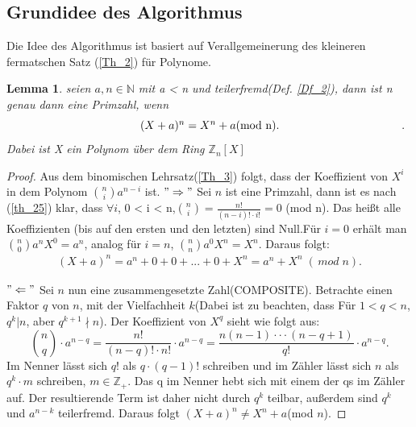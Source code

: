 \documentclass[12pt,oneside]{article}
\newtheorem{lemma}[theorem]{Lemma}
\theoremstyle{remark}
\theoremstyle{definition}
\begin{document}
\subsection{Grundidee des Algorithmus}
Die Idee des Algorithmus ist basiert auf  Verallgemeinerung des kleineren fermatschen Satz (\ref{Th_2}) für Polynome.
\begin{flushleft}
\begin{lemma}\label{hauptlemma}
seien $a,n \in \mathbb{N}$ mit a < n und teilerfremd(Def. \ref{Df_2}), dann ist n genau dann eine Primzahl, wenn \newline
\begin{equation}\label{eq:1}
\centerline{ $(X + a)^n = X^n +a $(mod n).}.
\end{equation}\newline
Dabei ist X ein Polynom über dem Ring $\mathbb{Z}_{n}[X]$
\end{lemma}
\begin{proof}
Aus dem binomischen Lehrsatz(\ref{Th_3}) folgt, dass der Koeffizient von $X^i$ in dem Polynom ${n \choose i} a^{n-i}$ ist.\newline\newline
$"\Rightarrow"$\newline
Sei $n$ ist eine Primzahl, dann ist es nach (\ref{th_25}) klar, dass $\forall i $, 0 < i < n,\newline\smallskip ${n \choose i} = \frac{n!}{(n-i)! \cdot i!} = 0 $ (mod n). Das heißt alle Koeffizienten (bis auf den ersten und den letzten) sind Null.\newline\newline Für $i = 0$ erhält man  ${n \choose 0} a^n X^0 = a^n$, analog für $i = n$, ${n \choose n} a^0 X^n = X^n$. Daraus folgt:
\begin{align*}
    (X + a)^n = a^n + 0 + 0 + ... + 0 + X^n = a^n + X^n \; ( \, mod \; n).
\end{align*}

$"\Leftarrow"$\newline
Sei $n$ nun eine zusammengesetzte Zahl(COMPOSITE). Betrachte einen Faktor $q$ von $n$, mit der Vielfachheit $k$(Dabei ist zu beachten, dass Für $1 < q < n$, $q^k | n$, aber $q^{k+1} \nmid n$).\newline
Der Koeffizient von $X^q$ sieht wie folgt aus:\newline\smallskip
\begin{equation}
    {n \choose q} \cdot a^{n-q} = \frac{n!}{(n-q)! \cdot n!} \cdot a^{n-q} = \frac{n(n-1)\cdot \cdot \cdot (n-q+1)}{q!} \cdot a^{n-q}.
\end{equation}
\newline\newline
Im Nenner lässt sich $q!$ als $q \cdot (q-1)!$ schreiben und im Zähler lässt sich $n$ als $q^k\cdot m$ schreiben, $m \in \mathbb{Z}_{+}$. Das q im Nenner hebt sich mit einem der qs im Zähler auf. Der resultierende Term ist daher nicht durch $q^k$ teilbar, außerdem sind $q^k$ und $a^{n-k}$ teilerfremd. Daraus folgt $(X + a)^n \neq X^n + a $(mod $n$).
\end{proof}


\end{flushleft}
\end{document}
